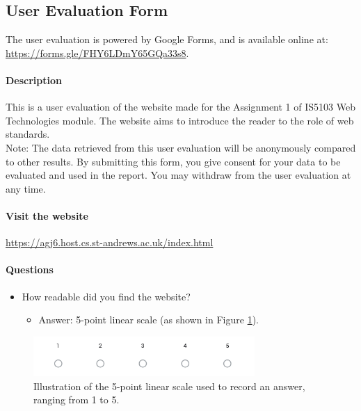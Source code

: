 \documentclass[letterpaper,12pt]{article}
\begin{document}
\begin{appendices}
\subsection{User Evaluation Form}

The user evaluation is powered by Google Forms, and is available online at: \url{https://forms.gle/FHY6LDmY65GQa33s8}.

\paragraph{Description} This is a user evaluation of the website made for the Assignment 1 of IS5103 Web Technologies module. The website aims to introduce the reader to the role of web standards.\\

Note: The data retrieved from this user evaluation will be anonymously compared to other results. By submitting this form, you give consent for your data to be evaluated and used in the report. You may withdraw from the user evaluation at any time.

\paragraph{Visit the website} \url{https://agj6.host.cs.st-andrews.ac.uk/index.html}

\paragraph{Questions}

\begin{itemize}
    \item How readable did you find the website?
    \begin{itemize}
        \item Answer: 5-point linear scale (as shown in Figure \ref{fig:linear-scale}).
    \end{itemize}
\end{itemize}

\begin{figure}[h] 
\centerline{\includegraphics[width=0.75\textwidth]{report/images/linear_scale.png}}
\caption{\label{fig:linear-scale}Illustration of the 5-point linear scale used to record an answer, ranging from 1 to 5.}
\end{figure}


\end{appendices}
\end{document}
